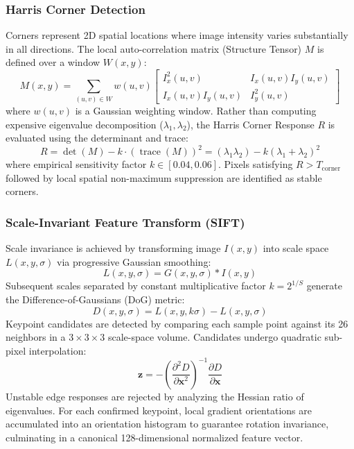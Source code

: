 \subsubsection{Harris Corner Detection}
Corners represent 2D spatial locations where image intensity varies substantially in all directions. The local auto-correlation matrix (Structure Tensor) $M$ is defined over a window $W(x,y)$:
\begin{equation}
    M(x,y) = \sum_{(u,v) \in W} w(u,v) \begin{bmatrix} I_x^2(u,v) & I_x(u,v) I_y(u,v) \\ I_x(u,v) I_y(u,v) & I_y^2(u,v) \end{bmatrix}
\end{equation}
where $w(u,v)$ is a Gaussian weighting window. Rather than computing expensive eigenvalue decomposition ($\lambda_1, \lambda_2$), the Harris Corner Response $R$ is evaluated using the determinant and trace:
\begin{equation}
    R = \det(M) - k \cdot (\operatorname{trace}(M))^2 = (\lambda_1 \lambda_2) - k (\lambda_1 + \lambda_2)^2
\end{equation}
where empirical sensitivity factor $k \in [0.04, 0.06]$. Pixels satisfying $R > T_{\text{corner}}$ followed by local spatial non-maximum suppression are identified as stable corners.

\subsubsection{Scale-Invariant Feature Transform (SIFT)}
Scale invariance is achieved by transforming image $I(x,y)$ into scale space $L(x,y,\sigma)$ via progressive Gaussian smoothing:
\begin{equation}
    L(x,y,\sigma) = G(x,y,\sigma) * I(x,y)
\end{equation}
Subsequent scales separated by constant multiplicative factor $k = 2^{1/S}$ generate the Difference-of-Gaussians (DoG) metric:
\begin{equation}
    D(x,y,\sigma) = L(x,y,k\sigma) - L(x,y,\sigma)
\end{equation}
Keypoint candidates are detected by comparing each sample point against its 26 neighbors in a $3\times3\times3$ scale-space volume. Candidates undergo quadratic sub-pixel interpolation:
\begin{equation}
    \mathbf{z} = -\left( \frac{\partial^2 D}{\partial \mathbf{x}^2} \right)^{-1} \frac{\partial D}{\partial \mathbf{x}}
\end{equation}
Unstable edge responses are rejected by analyzing the Hessian ratio of eigenvalues. For each confirmed keypoint, local gradient orientations are accumulated into an orientation histogram to guarantee rotation invariance, culminating in a canonical 128-dimensional normalized feature vector.

